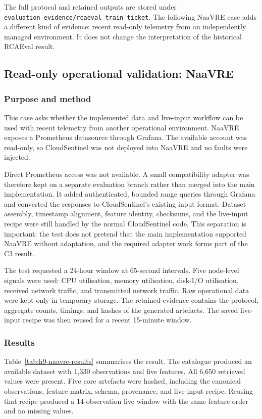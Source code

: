 The full protocol and retained outputs are stored under \texttt{evaluation\_evidence/rcaeval\_train\_ticket}. The following NaaVRE case adds a different kind of evidence: recent read-only telemetry from an independently managed environment. It does not change the interpretation of the historical RCAEval result.

\subsection{Read-only operational validation: NaaVRE}

\subsubsection{Purpose and method}

This case asks whether the implemented data and live-input workflow can be used with recent telemetry from another operational environment. NaaVRE exposes a Prometheus datasource through Grafana. The available account was read-only, so CloudSentinel was not deployed into NaaVRE and no faults were injected.

Direct Prometheus access was not available. A small compatibility adapter was therefore kept on a separate evaluation branch rather than merged into the main implementation. It added authenticated, bounded range queries through Grafana and converted the responses to CloudSentinel's existing input format. Dataset assembly, timestamp alignment, feature identity, checksums, and the live-input recipe were still handled by the normal CloudSentinel code. This separation is important: the test does not pretend that the main implementation supported NaaVRE without adaptation, and the required adapter work forms part of the C3 result.

The test requested a 24-hour window at 65-second intervals. Five node-level signals were used: CPU utilisation, memory utilisation, disk-I/O utilisation, received network traffic, and transmitted network traffic. Raw operational data were kept only in temporary storage. The retained evidence contains the protocol, aggregate counts, timings, and hashes of the generated artefacts. The saved live-input recipe was then reused for a recent 15-minute window.

\subsubsection{Results}

Table~\ref{tab:h9-naavre-results} summarises the result. The catalogue produced an available dataset with 1,330 observations and five features. All 6,650 retrieved values were present. Five core artefacts were hashed, including the canonical observations, feature matrix, schema, provenance, and live-input recipe. Reusing that recipe produced a 14-observation live window with the same feature order and no missing values.

